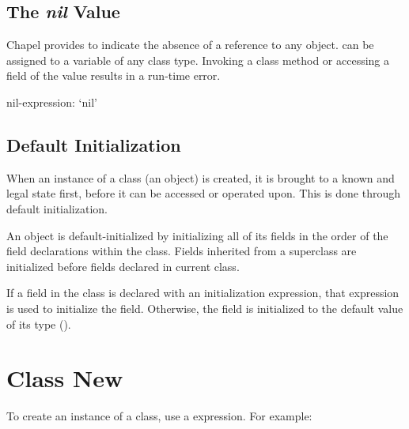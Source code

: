 \subsection{The {\em nil} Value}
\label{Class_nil_value}

Chapel provides  to indicate the absence of a reference to
any object.   can be assigned to a variable of any class
type.  Invoking a class method or accessing a field of the 
value results in a run-time error.

\begin{syntax}
nil-expression:
  `nil'
\end{syntax}

\subsection{Default Initialization}
\label{Default_Initialization}

When an instance of a class (an object) is created, it is brought to a
known and legal state first, before it can be accessed or operated upon.
This is done through default initialization.

An object is default-initialized by initializing all of its fields in
the order of the field declarations within the class. Fields inherited
from a superclass are initialized before fields declared in current class.

If a field in the class is declared with an initialization expression, that
expression is used to initialize the field.  Otherwise, the field is
initialized to the default value of its type
().

\section{Class New}
\label{Class_New}

To create an instance of a class, use a  expression. For
example:

